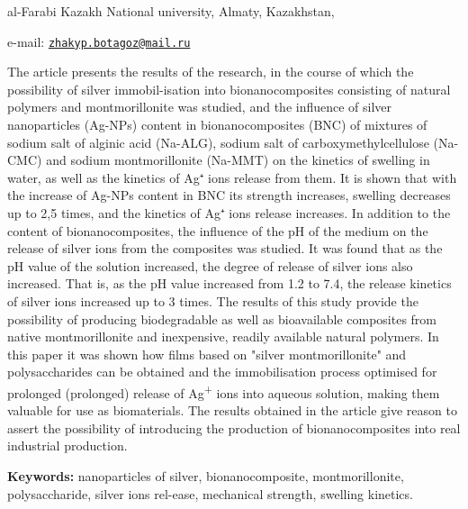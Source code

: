 \begin{affiliation}
al-Farabi Kazakh National university, Almaty, Kazakhstan,

e-mail:
\href{mailto:zhakyp.botagoz@mail.ru}{\nolinkurl{zhakyp.botagoz@mail.ru}}
\end{affiliation}

The article presents the results of the research, in the course of which
the possibility of silver immobil-isation into bionanocomposites
consisting of natural polymers and montmorillonite was studied, and the
influence of silver nanoparticles (Ag-NPs) content in bionanocomposites
(BNC) of mixtures of sodium salt of alginic acid (Na-ALG), sodium salt
of carboxymethylcellulose (Na-CMC) and sodium montmorillonite (Na-MMT)
on the kinetics of swelling in water, as well as the kinetics of Ag⁺
ions release from them. It is shown that with the increase of Ag-NPs
content in BNC its strength increases, swelling decreases up to 2,5
times, and the kinetics of Ag⁺ ions release increases. In addition to
the content of bionanocomposites, the influence of the pH of the medium
on the release of silver ions from the composites was studied. It was
found that as the pH value of the solution increased, the degree of
release of silver ions also increased. That is, as the pH value
increased from 1.2 to 7.4, the release kinetics of silver ions increased
up to 3 times. The results of this study provide the possibility of
producing biodegradable as well as bioavailable composites from native
montmorillonite and inexpensive, readily available natural polymers. In
this paper it was shown how films based on "silver montmorillonite" and
polysaccharides can be obtained and the immobilisation process optimised
for prolonged (prolonged) release of Ag\textsuperscript{+} ions into
aqueous solution, making them valuable for use as biomaterials. The
results obtained in the article give reason to assert the possibility of
introducing the production of bionanocomposites into real industrial
production.

{\bfseries Keywords:} nanoparticles of silver, bionanocomposite,
montmorillonite, polysaccharide, silver ions rel-ease, mechanical
strength, swelling kinetics.

